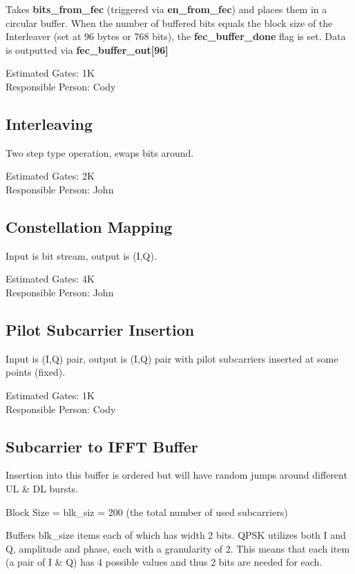 \documentclass[10pt,twocolumn]{article}
\begin{document}
		Takes \textbf{bits\_from\_fec} (triggered via \textbf{en\_from\_fec}) and
		places them in a circular buffer. When the number of
		buffered bits equals the block size of the Interleaver (set
		at 96 bytes or 768 bits), the \textbf{fec\_buffer\_done}
		flag is set. Data is outputted via \textbf{fec\_buffer\_out[96]}

		Estimated Gates: 1K \\
		Responsible Person: Cody

	\subsection{Interleaving}
		\label{sec:interleaving}

		Two step type operation, swaps bits around.

		Estimated Gates: 2K \\
		Responsible Person: John

	\subsection{Constellation Mapping}
		\label{sec:constellation}

		Input is bit stream, output is (I,Q).

		Estimated Gates: 4K \\
		Responsible Person: John

	\subsection{Pilot Subcarrier Insertion}
		\label{sec:pilot}

		Input is (I,Q) pair, output is (I,Q) pair with pilot subcarriers
		inserted at some points (fixed).

		Estimated Gates: 1K \\
		Responsible Person: Cody

	\subsection{Subcarrier to IFFT Buffer}
		\label{sec:ifft-buffer}
		Insertion into this buffer is ordered but will have random
		jumps around different UL \& DL bursts.

		Block Size = blk\_siz = 200 (the total number of used
		subcarriers)
		
		Buffers blk\_size items each of which has width 2 bits.
		QPSK utilizes both I and Q, amplitude and phase, each with
		a granularity of 2. This means that each item (a pair of I
		\& Q) has 4 possible values and thus 2 bits are needed for
		each.
\end{document}
